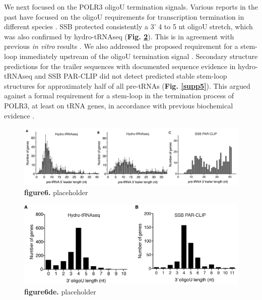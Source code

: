 \documentclass[12pt]{rockefeller}
\begin{document}
We next focused on the POLR3 oligoU termination signals. Various reports in the past have focused on the oligoU requirements for transcription termination in different species \cite{Arimbasseri:2014hj,Nielsen:2013be}. SSB protected consistently a 3’ 4 to 5 nt oligoU stretch, which was also confirmed by hydro-tRNAseq (\textbf{Fig. \ref{paper6de}}). This is in agreement with previous \textit{in vitro} results \cite{Bayfield:2009cx,Stefano:1984wp,Teplova:2006dv}. We also addressed the proposed requirement for a stem-loop immediately upstream of the oligoU termination signal \cite{Nielsen:2013be}. Secondary structure predictions for the trailer sequences with documented sequence evidence in hydro-tRNAseq and SSB PAR-CLIP did not detect predicted stable stem-loop structures for approximately half of all pre-tRNAs (\textbf{Fig. \ref{supp5}}). This argued against a formal requirement for a stem-loop in the termination process of POLR3, at least on tRNA genes, in accordance with previous biochemical evidence \cite{Arimbasseri:2014hj}.

\begin{figure}[!ht]%
\centering
\includegraphics[width=\textwidth]{paper6.png}%
\caption[figure6]
{\textbf{figure6.}
placeholder}
\centering
\label{paper6}%
\end{figure}

\begin{figure}[!ht]%
\centering
\includegraphics[width=\textwidth]{paper6de.png}%
\caption[figure6de]
{\textbf{figure6de.}
placeholder}
\centering
\label{paper6de}%
\end{figure}
\end{document}
